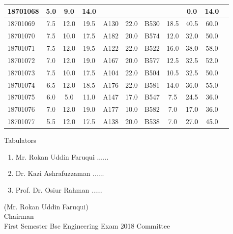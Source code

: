 \documentclass[12pt]{article}
\begin{document}
\begin{center}
\begin{small}
\begin{tabular}{|l|c|c|c|c|c|c|c|c|c|c|}
18701068 & 5.0 & 9.0 & 14.0 &  &  &  &  & 0.0 & 14.0\\ \hline 
18701069 & 7.5 & 12.0 & 19.5 & A130 & 22.0 & B530 & 18.5 & 40.5 & 60.0\\ \hline 
18701070 & 7.5 & 10.0 & 17.5 & A182 & 20.0 & B574 & 12.0 & 32.0 & 50.0\\ \hline 
18701071 & 7.5 & 12.0 & 19.5 & A122 & 22.0 & B522 & 16.0 & 38.0 & 58.0\\ \hline 
18701072 & 7.0 & 12.0 & 19.0 & A167 & 20.0 & B577 & 12.5 & 32.5 & 52.0\\ \hline 
18701073 & 7.5 & 10.0 & 17.5 & A104 & 22.0 & B504 & 10.5 & 32.5 & 50.0\\ \hline 
18701074 & 6.5 & 12.0 & 18.5 & A176 & 22.0 & B581 & 14.0 & 36.0 & 55.0\\ \hline 
18701075 & 6.0 & 5.0 & 11.0 & A147 & 17.0 & B547 & 7.5 & 24.5 & 36.0\\ \hline 
18701076 & 7.0 & 12.0 & 19.0 & A177 & 10.0 & B582 & 7.0 & 17.0 & 36.0\\ \hline 
18701077 & 5.5 & 12.0 & 17.5 & A138 & 20.0 & B538 & 7.0 & 27.0 & 45.0\\ \hline 
        \end{tabular}
            \end{small}
            \end{center}
  \centering
            
            \begin{table}[hb]
            	\centering
            \begin{minipage}[b]{0.5\linewidth} %
            {\centering Tabulators }
            \begin{enumerate}
                \item Mr. Rokan Uddin Faruqui \hspace*{1ex} $\ldots \ldots  $  
                \item Dr. Kazi Ashrafuzzaman \hspace*{1ex} $\ldots \ldots  $  
                \item Prof. Dr. Osiur Rahman \hspace*{1ex} $\ldots \ldots $  
            \end{enumerate} 

            \end{minipage}
            \hspace*{1.2cm}
            \begin{minipage}[b]{0.4\linewidth} \centering
            (Mr. Rokan Uddin Faruqui) \\
            Chairman  \hspace*{1ex} \\
           First Semester Bsc Engineering Exam 2018 Committee
            \end{minipage}
            \end{table}
            \clearpage
            \clearpage
            
\end{document}
